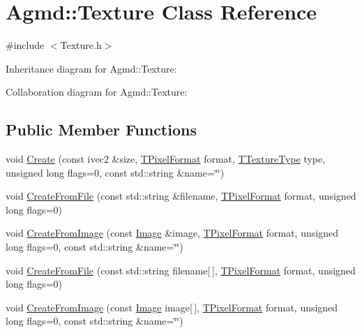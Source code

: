 \hypertarget{class_agmd_1_1_texture}{\section{Agmd\+:\+:Texture Class Reference}
\label{class_agmd_1_1_texture}
}


{\ttfamily \#include $<$Texture.\+h$>$}



Inheritance diagram for Agmd\+:\+:Texture\+:


Collaboration diagram for Agmd\+:\+:Texture\+:
\subsection*{Public Member Functions}
\begin{DoxyCompactItemize}
\item 
void \hyperlink{class_agmd_1_1_texture_ab51a802868f0cf987aa1e1f8a1422357}{Create} (const ivec2 \&size, \hyperlink{namespace_agmd_afc48fd9fa5dccb4c5621c052bfd1a7ec}{T\+Pixel\+Format} format, \hyperlink{namespace_agmd_a7036bece09449a930cfec410f75e85f4}{T\+Texture\+Type} type, unsigned long flags=0, const std\+::string \&name=\char`\"{}\char`\"{})
\item 
void \hyperlink{class_agmd_1_1_texture_abeb5dabf5ef59f83c4c4adb8ef091d96}{Create\+From\+File} (const std\+::string \&filename, \hyperlink{namespace_agmd_afc48fd9fa5dccb4c5621c052bfd1a7ec}{T\+Pixel\+Format} format, unsigned long flags=0)
\item 
void \hyperlink{class_agmd_1_1_texture_a3e117c4750da5def2f6877da8c266239}{Create\+From\+Image} (const \hyperlink{class_agmd_1_1_image}{Image} \&image, \hyperlink{namespace_agmd_afc48fd9fa5dccb4c5621c052bfd1a7ec}{T\+Pixel\+Format} format, unsigned long flags=0, const std\+::string \&name=\char`\"{}\char`\"{})
\item 
void \hyperlink{class_agmd_1_1_texture_a96d9f45d9e6b95b265d68fb7d5d9f078}{Create\+From\+File} (const std\+::string filename\mbox{[}$\,$\mbox{]}, \hyperlink{namespace_agmd_afc48fd9fa5dccb4c5621c052bfd1a7ec}{T\+Pixel\+Format} format, unsigned long flags=0)
\item 
void \hyperlink{class_agmd_1_1_texture_a3ea020baa0eddfff7cd732bb4c1042c2}{Create\+From\+Image} (const \hyperlink{class_agmd_1_1_image}{Image} image\mbox{[}$\,$\mbox{]}, \hyperlink{namespace_agmd_afc48fd9fa5dccb4c5621c052bfd1a7ec}{T\+Pixel\+Format} format, unsigned long flags=0, const std\+::string \&name=\char`\"{}\char`\"{})
\item 

\end{DoxyCompactItemize}
